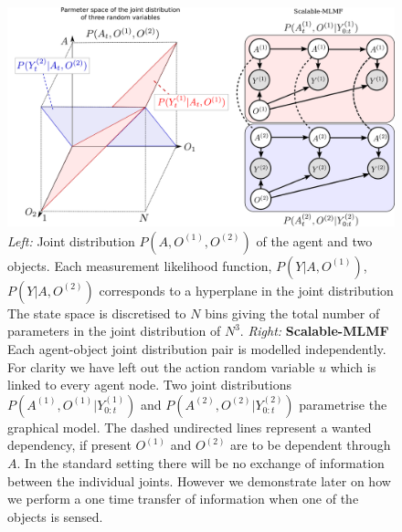 \begin{figure}
 \centering
  \includegraphics[width=\textwidth]{./ch5-MLMF/Figures/Figure8_v2.pdf}
  \caption{\textit{Left:} Joint distribution $P(A,O^{(1)},O^{(2)})$ of the agent and two objects. Each measurement likelihood function, $P(Y|A,O^{(1)})$, 
  $P(Y|A,O^{(2)})$ corresponds to a hyperplane in the joint distribution
  The state space is discretised to $N$ bins giving the total number of parameters in the joint distribution of $N^3$. 
  \textit{Right:} \textbf{Scalable-MLMF} Each agent-object joint distribution pair is modelled independently. For clarity we have left 
  out the action random variable $u$ which is linked to every agent node.
  Two joint distributions $P(A^{(1)},O^{(1)}|Y^{(1)}_{0:t})$   and $P(A^{(2)},O^{(2)}|Y^{(2)}_{0:t})$ parametrise the graphical model. 
  The dashed undirected lines represent a wanted dependency, if present $O^{(1)}$ and $O^{(2)}$ are to be dependent through $A$. In
  the standard setting there will be no exchange of information between the individual joints. However we demonstrate later on how
  we perform a one time transfer of information when one of the objects is sensed.}
  \label{fig:3bel_lik_profile}
\end{figure}

